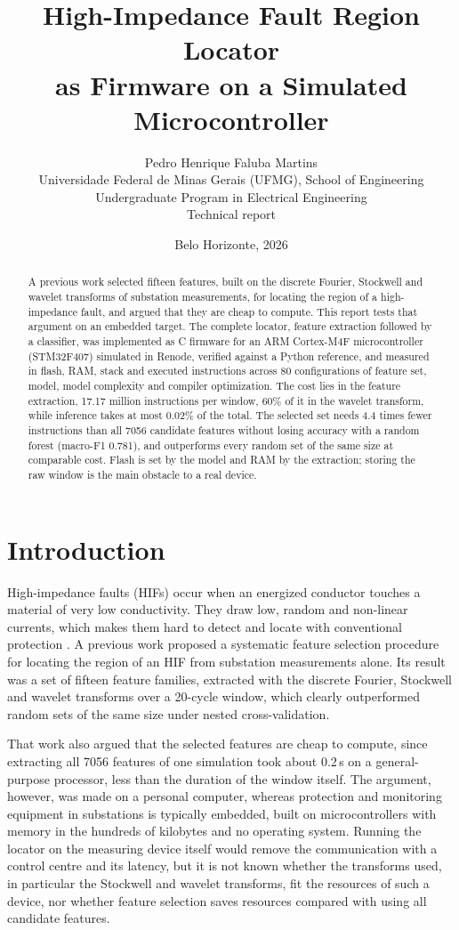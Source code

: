 \documentclass[11pt,a4paper]{article}
\title{High-Impedance Fault Region Locator \\ as Firmware on a Simulated Microcontroller}
\author{Pedro Henrique Faluba Martins \\[0.3em]
  \small Universidade Federal de Minas Gerais (UFMG), School of Engineering \\
  \small Undergraduate Program in Electrical Engineering \\[0.3em]
  \small Technical report}
\date{Belo Horizonte, 2026}
\begin{document}
\maketitle

\begin{abstract}
\noindent
A previous work selected fifteen features, built on the discrete Fourier, Stockwell and wavelet transforms of substation measurements, for locating the region of a high-impedance fault, and argued that they are cheap to compute. This report tests that argument on an embedded target. The complete locator, feature extraction followed by a classifier, was implemented as C firmware for an ARM Cortex-M4F microcontroller (STM32F407) simulated in Renode, verified against a Python reference, and measured in flash, RAM, stack and executed instructions across 80 configurations of feature set, model, model complexity and compiler optimization. The cost lies in the feature extraction, 17.17 million instructions per window, 60\% of it in the wavelet transform, while inference takes at most 0.02\% of the total. The selected set needs 4.4 times fewer instructions than all 7056 candidate features without losing accuracy with a random forest (macro-F1 0.781), and outperforms every random set of the same size at comparable cost. Flash is set by the model and RAM by the extraction; storing the raw window is the main obstacle to a real device.
\end{abstract}

\section{Introduction}

High-impedance faults (HIFs) occur when an energized conductor touches a material of very low conductivity. They draw low, random and non-linear currents, which makes them hard to detect and locate with conventional protection \citep{[3]}. A previous work \citep{martins_tcc_en} proposed a systematic feature selection procedure for locating the region of an HIF from substation measurements alone. Its result was a set of fifteen feature families, extracted with the discrete Fourier, Stockwell and wavelet transforms over a 20-cycle window, which clearly outperformed random sets of the same size under nested cross-validation.

That work also argued that the selected features are cheap to compute, since extracting all 7056 features of one simulation took about 0.2\,s on a general-purpose processor, less than the duration of the window itself. The argument, however, was made on a personal computer, whereas protection and monitoring equipment in substations is typically embedded, built on microcontrollers with memory in the hundreds of kilobytes and no operating system. Running the locator on the measuring device itself would remove the communication with a control centre and its latency, but it is not known whether the transforms used, in particular the Stockwell and wavelet transforms, fit the resources of such a device, nor whether feature selection saves resources compared with using all candidate features.
\end{document}
